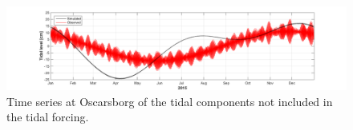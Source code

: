 \begin{figure}[tbh] 
	\centerline{ \includegraphics*[trim=3cm 0cm 2.5cm 0cm,clip=true,width=\textwidth]{Figurer/Oscarsborg_Tide_not_included} } 
	\caption{\small Time series at Oscarsborg of the tidal components not included in the tidal forcing.} 
	\label{fig:Waterlevel_tide} 
\end{figure} 


